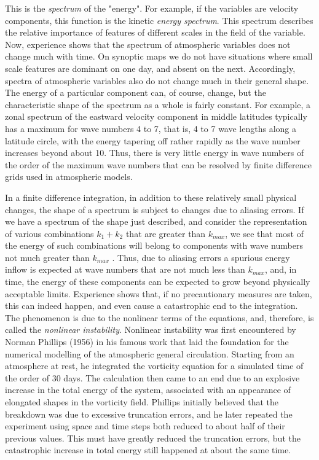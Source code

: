 This is the \emph{spectrum} of the "energy". For example, if the
variables are velocity components, this function is the kinetic
\emph{energy spectrum}. This spectrum describes the relative importance
of features of different scales in the field of the variable. Now,
experience shows that the spectrum of atmospheric variables does not
change much with time. On synoptic maps we do not have situations where
small scale features are dominant on one day, and absent on the next.
Accordingly, spectra of atmospheric variables also do not change much in
their general shape. The energy of a particular component can, of
course, change, but the characteristic shape of the spectrum as a whole
is fairly constant. For example, a zonal spectrum of the eastward
velocity component in middle latitudes typically has a maximum for wave
numbers 4 to 7, that is, 4 to 7 wave lengths along a latitude circle,
with the energy tapering off rather rapidly as the wave number increases
beyond about 10. Thus, there is very little energy in wave numbers of
the order of the maximum wave numbers that can be resolved by finite
difference grids used in atmospheric models.

In a finite difference integration, in addition to these relatively
small physical changes, the shape of a spectrum is subject to changes
due to aliasing errors. If we have a spectrum of the shape just
described, and consider the representation of various combinations
\(k_1+k_2\) that are greater than \(k_{max}\), we see that most of the
energy of such combinations will belong to components with wave numbers
not much greater than \(k_{max}\) . Thus, due to aliasing errors a
spurious energy inflow is expected at wave numbers that are not much
less than \(k_{max}\), and, in time, the energy of these components can
be expected to grow beyond physically acceptable limits. Experience
shows that, if no precautionary measures are taken, this can indeed
happen, and even cause a catastrophic end to the integration. The
phenomenon is due to the nonlinear terms of the equations, and,
therefore, is called the \emph{nonlinear instability}. Nonlinear
instability was first encountered by Norman Phillips (1956) in his
famous work that laid the foundation for the numerical modelling of the
atmospheric general circulation. Starting from an atmosphere at rest,
he integrated the vorticity equation for a simulated time of the order
of 30 days. The calculation then came to an end due to an explosive
increase in the total energy of the system, associated with an
appearance of elongated shapes in the vorticity field. Phillips
initially believed that the breakdown was due to excessive truncation
errors, and he later repeated the experiment using space and time steps
both reduced to about half of their previous values. This must have
greatly reduced the truncation errors, but the catastrophic increase in
total energy still happened at about the same time.

